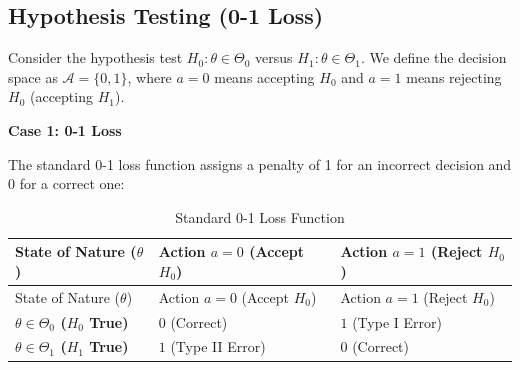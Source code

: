 \documentclass[
  letterpaper,
  DIV=11,
  numbers=noendperiod]{scrreprt}
\renewcommand{\[}{\begin{equation}}
\renewcommand{\]}{\end{equation}}
\theoremstyle{definition}
\theoremstyle{plain}
\theoremstyle{plain}
\theoremstyle{plain}
\theoremstyle{definition}
\theoremstyle{plain}
\theoremstyle{remark}
\begin{document}
\subsection{Hypothesis Testing (0-1
Loss)}\label{hypothesis-testing-0-1-loss}

Consider the hypothesis test \(H_0: \theta \in \Theta_0\) versus
\(H_1: \theta \in \Theta_1\). We define the decision space as
\(\mathcal{A} = \{0, 1\}\), where \(a=0\) means accepting \(H_0\) and
\(a=1\) means rejecting \(H_0\) (accepting \(H_1\)).

\textbf{Case 1: 0-1 Loss}

The standard 0-1 loss function assigns a penalty of 1 for an incorrect
decision and 0 for a correct one:

\begin{longtable}[]{@{}
  >{\raggedright\arraybackslash}p{}
  >{\centering\arraybackslash}p{}
  >{\centering\arraybackslash}p{}@{}}
\caption{Standard 0-1 Loss Function}\label{tbl-loss-std}\tabularnewline
\toprule\noalign{}
\begin{minipage}[b]{\linewidth}\raggedright
State of Nature (\(\theta\))
\end{minipage} & \begin{minipage}[b]{\linewidth}\centering
Action \(a=0\) (Accept \(H_0\))
\end{minipage} & \begin{minipage}[b]{\linewidth}\centering
Action \(a=1\) (Reject \(H_0\))
\end{minipage} \\
\midrule\noalign{}
\endfirsthead
\toprule\noalign{}
\begin{minipage}[b]{\linewidth}\raggedright
State of Nature (\(\theta\))
\end{minipage} & \begin{minipage}[b]{\linewidth}\centering
Action \(a=0\) (Accept \(H_0\))
\end{minipage} & \begin{minipage}[b]{\linewidth}\centering
Action \(a=1\) (Reject \(H_0\))
\end{minipage} \\
\midrule\noalign{}
\endhead
\bottomrule\noalign{}
\endlastfoot
\textbf{\(\theta \in \Theta_0\) (\(H_0\) True)} & \(0\) (Correct) &
\(1\) (Type I Error) \\
\textbf{\(\theta \in \Theta_1\) (\(H_1\) True)} & \(1\) (Type II Error)
& \(0\) (Correct) \\
\end{longtable}
\end{document}
